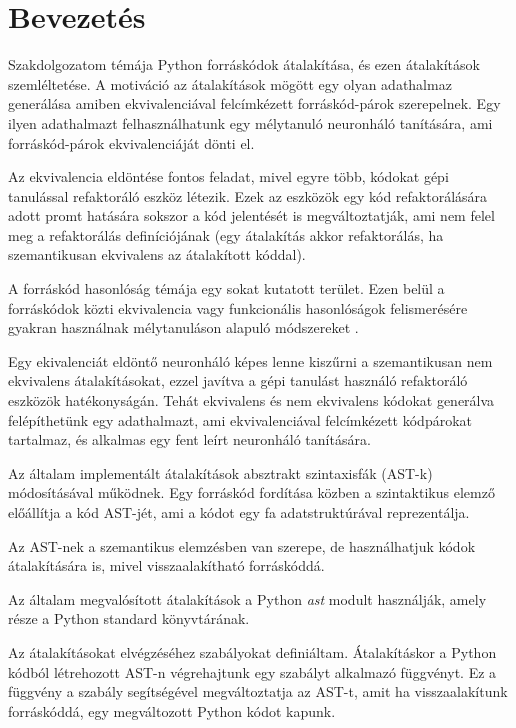 \chapter{Bevezetés}
\label{ch:intro}


Szakdolgozatom témája Python forráskódok átalakítása, és ezen átalakítások szemléltetése.
A motiváció az átalakítások mögött egy olyan adathalmaz generálása amiben
ekvivalenciával felcímkézett forráskód-párok szerepelnek.
Egy ilyen adathalmazt felhasználhatunk egy mélytanuló
neuronháló tanítására, ami forráskód-párok ekvivalenciáját dönti el.

Az ekvivalencia eldöntése fontos feladat, mivel egyre több, kódokat gépi tanulással refaktoráló eszköz létezik.
Ezek az eszközök egy kód refaktorálására adott promt hatására sokszor a kód jelentését is megváltoztatják,
ami nem felel meg a refaktorálás definíciójának
(egy átalakítás akkor refaktorálás, ha szemantikusan ekvivalens az átalakított kóddal).

A forráskód hasonlóság témája egy sokat kutatott terület.
Ezen belül a forráskódok közti ekvivalencia vagy funkcionális hasonlóságok felismerésére
gyakran használnak mélytanuláson alapuló módszereket
\cite{CCLearner,DeepSim,ContextualEmbeddings,ContrastiveCodeRepair}.

Egy ekivalenciát eldöntő neuronháló képes lenne kiszűrni a szemantikusan nem ekvivalens átalakításokat,
ezzel javítva a gépi tanulást használó refaktoráló eszközök hatékonyságán.
Tehát ekvivalens és nem ekvivalens kódokat generálva felépíthetünk egy adathalmazt, ami
ekvivalenciával felcímkézett kódpárokat tartalmaz, és alkalmas egy fent leírt neuronháló
tanítására.

Az általam implementált átalakítások absztrakt szintaxisfák (AST-k) módosításával működnek.
Egy forráskód fordítása közben a szintaktikus elemző előállítja a kód AST-jét,
ami a kódot egy fa adatstruktúrával reprezentálja.

Az AST-nek a szemantikus elemzésben van szerepe,
de használhatjuk kódok átalakítására is, mivel visszaalakítható forráskóddá.

Az általam megvalósított átalakítások a Python \emph{ast} modult \cite{pythonAST} használják,
amely része a Python standard könyvtárának.

Az átalakításokat elvégzéséhez szabályokat definiáltam.
Átalakításkor a Python kódból létrehozott AST-n végrehajtunk egy szabályt alkalmazó függvényt.
Ez a függvény a szabály segítségével megváltoztatja az AST-t, amit ha visszaalakítunk forráskóddá,
egy megváltozott Python kódot kapunk.

